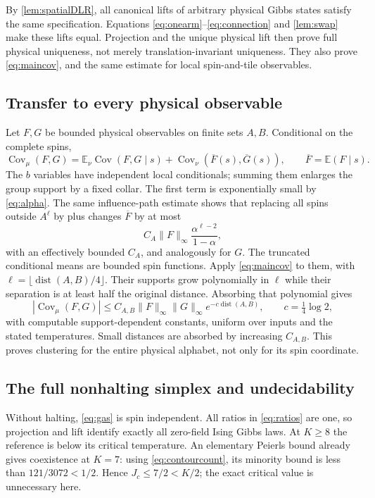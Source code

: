 \documentclass[11pt,reqno]{amsart}
\numberwithin{equation}{section}
\theoremstyle{definition}
\theoremstyle{remark}
\newcommand{\E}{\mathbb E}
\newcommand{\Cov}{\operatorname{Cov}}
\newcommand{\dist}{\operatorname{dist}}
\newcommand{\norm}[1]{\lVert#1\rVert}
\begin{document}
By \cref{lem:spatialDLR}, all canonical lifts of arbitrary physical Gibbs states satisfy the same specification. Equations \eqref{eq:onearm}--\eqref{eq:connection} and \cref{lem:swap} make these lifts equal. Projection and the unique physical lift then prove full physical uniqueness, not merely translation-invariant uniqueness. They also prove \eqref{eq:maincov}, and the same estimate for local spin-and-tile observables.

\subsection{Transfer to every physical observable}\label{sec:physicalcluster}
Let $F,G$ be bounded physical observables on finite sets $A,B$. Conditional on the complete spins,
\begin{equation}\label{eq:covdecomp}
 \Cov_\mu(F,G)=\E_\nu\Cov(F,G\mid s)
 +\Cov_\nu(\overline F(s),\overline G(s)),\qquad
 \overline F=\E(F\mid s).
\end{equation}
The $b$ variables have independent local conditionals; summing them enlarges the group support by a fixed collar. The first term is exponentially small by \eqref{eq:alpha}. The same influence-path estimate shows that replacing all spins outside $A^\ell$ by plus changes $\overline F$ by at most
\begin{equation}\label{eq:quasilocalF}
 C_A\norm F_\infty\frac{\alpha^{\ell-2}}{1-\alpha},
\end{equation}
with an effectively bounded $C_A$, and analogously for $G$. The truncated conditional means are bounded spin functions. Apply \eqref{eq:maincov} to them, with $\ell=\lfloor\dist(A,B)/4\rfloor$. Their supports grow polynomially in $\ell$ while their separation is at least half the original distance. Absorbing that polynomial gives
\begin{equation}\label{eq:physicalcov}
 |\Cov_\mu(F,G)|\leq C_{A,B}\norm F_\infty\norm G_\infty e^{-c\dist(A,B)},
 \qquad c=\tfrac14\log2,
\end{equation}
with computable support-dependent constants, uniform over inputs and the stated temperatures. Small distances are absorbed by increasing $C_{A,B}$. This proves clustering for the entire physical alphabet, not only for its spin coordinate.

\subsection{The full nonhalting simplex and undecidability}\label{sec:simplex}
Without halting, \eqref{eq:gas} is spin independent. All ratios in \eqref{eq:ratios} are one, so projection and lift identify exactly all zero-field Ising Gibbs laws. At $K\geq8$ the reference is below its critical temperature. An elementary Peierls bound already gives coexistence at $K=7$: using \eqref{eq:contourcount}, its minority bound is less than $121/3072<1/2$. Hence $J_c\leq7/2< K/2$; the exact critical value is unnecessary here.
\end{document}

